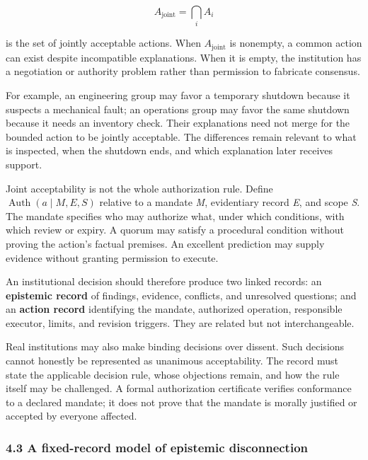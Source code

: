 \documentclass[
  10pt,
]{article}
\begin{document}
\protect\hypertarget{math-E0051-0062}{}{\[
A_{\mathrm{joint}} = \bigcap_i A_i
\]}

is the set of jointly acceptable actions. When \protect\hypertarget{math-E0052-0063}{}{\(A_{\mathrm{joint}}\)} is nonempty, a common action can exist despite incompatible explanations. When it is empty, the institution has a negotiation or authority problem rather than permission to fabricate consensus.

For example, an engineering group may favor a temporary shutdown because it suspects a mechanical fault; an operations group may favor the same shutdown because it needs an inventory check. Their explanations need not merge for the bounded action to be jointly acceptable. The differences remain relevant to what is inspected, when the shutdown ends, and which explanation later receives support.

Joint acceptability is not the whole authorization rule. Define \protect\hypertarget{math-E0053-0064}{}{\(\operatorname{Auth}(a\mid M,E,S)\)} relative to a mandate \emph{M}, evidentiary record \emph{E}, and scope \emph{S}. The mandate specifies who may authorize what, under which conditions, with which review or expiry. A quorum may satisfy a procedural condition without proving the action's factual premises. An excellent prediction may supply evidence without granting permission to execute.

An institutional decision should therefore produce two linked records: an \textbf{epistemic record} of findings, evidence, conflicts, and unresolved questions; and an \textbf{action record} identifying the mandate, authorized operation, responsible executor, limits, and revision triggers. They are related but not interchangeable.

Real institutions may also make binding decisions over dissent. Such decisions cannot honestly be represented as unanimous acceptability. The record must state the applicable decision rule, whose objections remain, and how the rule itself may be challenged. A formal authorization certificate verifies conformance to a declared mandate; it does not prove that the mandate is morally justified or accepted by everyone affected.

\subsubsection{4.3 A fixed-record model of epistemic disconnection}\label{a-fixed-record-model-of-epistemic-disconnection}
\end{document}
